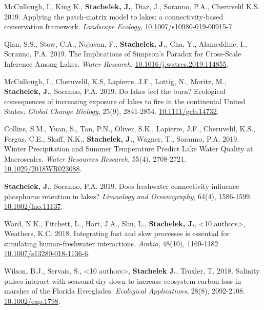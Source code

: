 \documentclass[11pt]{article}
\makeatletter
\newlength{\bibhang}
\newlength{\bibsep}
 {\@listi \global\bibsep\itemsep \global\advance\bibsep by\parsep}
\newenvironment{bibenum*}
  {\renewcommand\labelenumi{[\theenumi]}%
   \etaremune[
     topsep=0pt,
     itemsep=\bibsep,
     parsep=0pt,partopsep=0pt,
     itemindent=-\bibhang,
     leftmargin={\bibhang+\widthof{[999]}}]}
  {\endetaremune}
\makeatother
\begin{document}
\begin{bibenum*}

\item McCullough, I., King K., \textbf{Stachelek, J.}, Diaz, J., Soranno, P.A., Cheruvelil K.S. 2019. Applying the patch-matrix model to lakes: a connectivity-based conservation framework. \emph{Landscape Ecology}, \href{https://doi.org/10.1007/s10980-019-00915-7}{10.1007/s10980-019-00915-7}.

\item Qian, S.S., Stow, C.A., Nojavan, F., \textbf{Stachelek, J.}, Cha, Y., Alameddine, I., Soranno, P.A. 2019. The Implications of Simpson's Paradox for Cross-Scale Inference Among Lakes. \emph{Water Research}, \href{https://doi.org/10.1016/j.watres.2019.114855}{10.1016/j.watres.2019.114855}.

\item McCullough, I., Cheruvelil, K.S, Lapierre, J.F., Lottig, N., Moritz, M., \textbf{Stachelek, J.}, Soranno, P.A. 2019. Do lakes feel the burn? Ecological consequences of increasing exposure of lakes to fire in the continental United States. \emph{Global Change Biology}, 25(9), 2841-2854. \href{https://doi.org/10.1111/gcb.14732}{10.1111/gcb.14732}.

\item Collins, S.M., Yuan, S., Tan, P.N., Oliver, S.K., Lapierre, J.F., Cheruvelil, K.S., Fergus, C.E., Skaff, N.K., \textbf{Stachelek, J.}, Wagner, T., Soranno, P.A. 2019. Winter Precipitation and Summer Temperature Predict Lake Water Quality at Macroscales. \emph{Water Resources Research}, 55(4), 2708-2721. \href{https://doi.org/10.1029/2018WR023088}{10.1029/2018WR023088}.

\item \textbf{Stachelek, J.}, Soranno, P.A. 2019. Does freshwater connectivity influence phosphorus retention in lakes? \emph{Limnology and Oceanography}, 64(4), 1586-1599. \href{https://doi.org/10.1002/lno.11137}{10.1002/lno.11137}.

\item Ward, N.K., Fitchett, L., Hart, J.A., Shu, L., \textbf{Stachelek, J.}, <10 authors>, Weathers, K.C. 2018. Integrating fast and slow processes is essential for simulating human-freshwater interactions. \emph{Ambio}, 48(10), 1169-1182 \href{https://doi.org/10.1007/s13280-018-1136-6}{10.1007/s13280-018-1136-6}.

  \item Wilson, B.J., Servais, S., <10 authors>, \textbf{Stachelek J.}, Troxler, T. 2018. Salinity pulses interact with seasonal dry‐down to increase ecosystem carbon loss in marshes of the Florida Everglades. \emph{Ecological Applications}, 28(8), 2092-2108. \href{https://doi.org/10.1002/eap.1798}{10.1002/eap.1798}.


\end{bibenum*}
\end{document}
